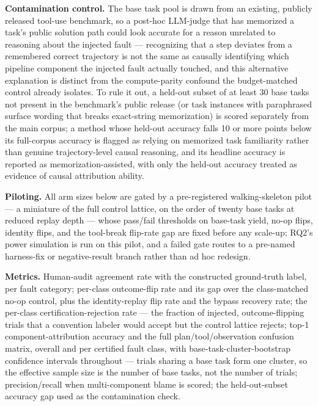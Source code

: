 \documentclass[11pt]{article}
\begin{document}
\textbf{Contamination control.} The base task pool is drawn from an existing, publicly released tool-use benchmark, so a post-hoc LLM-judge that has memorized a task's public solution path could look accurate for a reason unrelated to reasoning about the injected fault --- recognizing that a step deviates from a remembered correct trajectory is not the same as causally identifying which pipeline component the injected fault actually touched, and this alternative explanation is distinct from the compute-parity confound the budget-matched control already isolates. To rule it out, a held-out subset of at least 30 base tasks not present in the benchmark's public release (or task instances with paraphrased surface wording that breaks exact-string memorization) is scored separately from the main corpus; a method whose held-out accuracy falls 10 or more points below its full-corpus accuracy is flagged as relying on memorized task familiarity rather than genuine trajectory-level causal reasoning, and its headline accuracy is reported as memorization-assisted, with only the held-out accuracy treated as evidence of causal attribution ability.

\textbf{Piloting.} All arm sizes below are gated by a pre-registered walking-skeleton pilot --- a miniature of the full control lattice, on the order of twenty base tasks at reduced replay depth --- whose pass/fail thresholds on base-task yield, no-op flips, identity flips, and the tool-break flip-rate gap are fixed before any scale-up; RQ2's power simulation is run on this pilot, and a failed gate routes to a pre-named harness-fix or negative-result branch rather than ad hoc redesign.

\textbf{Metrics.} Human-audit agreement rate with the constructed ground-truth label, per fault category; per-class outcome-flip rate and its gap over the class-matched no-op control, plus the identity-replay flip rate and the bypass recovery rate; the per-class certification-rejection rate --- the fraction of injected, outcome-flipping trials that a convention labeler would accept but the control lattice rejects; top-1 component-attribution accuracy and the full plan/tool/observation confusion matrix, overall and per certified fault class, with base-task-cluster-bootstrap confidence intervals throughout --- trials sharing a base task form one cluster, so the effective sample size is the number of base tasks, not the number of trials; precision/recall when multi-component blame is scored; the held-out-subset accuracy gap used as the contamination check.
\end{document}
